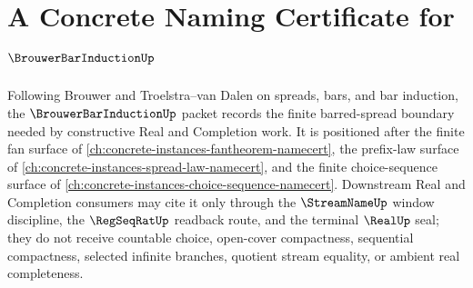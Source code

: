 \chapter{A Concrete Naming Certificate for $\BrouwerBarInductionUp$}
\label{ch:concrete-instances-brouwer-bar-induction-namecert}

Following Brouwer and Troelstra--van Dalen on spreads, bars, and bar induction, the $\BrouwerBarInductionUp$ packet records the finite barred-spread boundary needed by constructive Real and Completion work. It is positioned after the finite fan surface of \autoref{ch:concrete-instances-fantheorem-namecert}, the prefix-law surface of \autoref{ch:concrete-instances-spread-law-namecert}, and the finite choice-sequence surface of \autoref{ch:concrete-instances-choice-sequence-namecert}. Downstream Real and Completion consumers may cite it only through the $\StreamNameUp$ window discipline, the $\RegSeqRatUp$ readback route, and the terminal $\RealUp$ seal; they do not receive countable choice, open-cover compactness, sequential compactness, selected infinite branches, quotient stream equality, or ambient real completeness.

